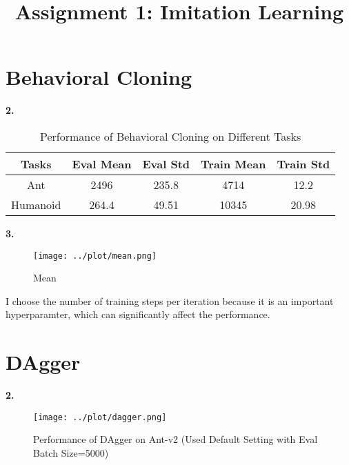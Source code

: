 \documentclass[10pt, a4paper]{ctexart}
\begin{document}
\title{Assignment 1: Imitation Learning}
\date{}
\author{}
\maketitle

\section{Behavioral Cloning}
{\bf{2.}}
\begin{table}[H]
    \centering
    \begin{tabular}{c|c|c|c|c}
        \hline
        \hline
        Tasks&Eval Mean&Eval Std&Train Mean&Train Std\\
        \hline
        Ant&2496&235.8&4714&12.2\\
        \hline
        Humanoid&264.4&49.51&10345&20.98\\
        \hline
    \end{tabular}
    \caption{Performance of Behavioral Cloning on Different Tasks}
\end{table}
{\bf{3.}}
\begin{figure}[H]
    \centering
    \texttt{[image: ../plot/mean.png]}
    \caption{Mean}
\end{figure}
I choose the number of training steps per iteration because it is an important hyperparamter, which can significantly affect the performance.

\section{DAgger}
{\bf{2.}}
\begin{figure}[H]
    \centering
    \texttt{[image: ../plot/dagger.png]}
    \caption{Performance of DAgger on Ant-v2 (Used Default Setting with Eval Batch Size=5000)}
\end{figure}
\end{document}
